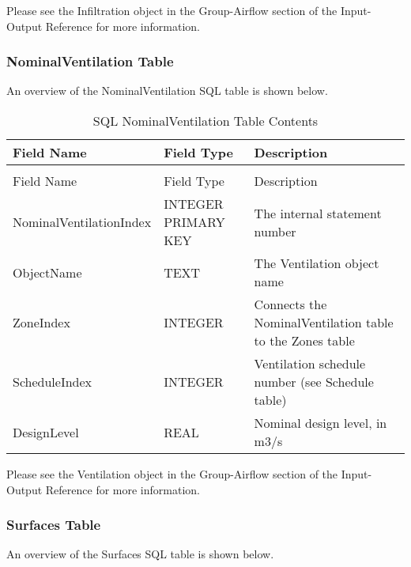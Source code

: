 Please see the Infiltration object in the Group-Airflow section of the Input-Output Reference for more information.

\subsubsection{NominalVentilation Table}

An overview of the NominalVentilation SQL table is shown below.

\begin{longtable}[c]{p{1.5in}p{1.5in}p{3.0in}}
\caption{SQL NominalVentilation Table Contents \label{table:table-24.-sql-nominalventilation-table}} \tabularnewline
\toprule 
Field Name & Field Type & Description \tabularnewline
\midrule
\endfirsthead

\caption[]{SQL NominalVentilation Table Contents} \tabularnewline
\toprule 
Field Name & Field Type & Description \tabularnewline
\midrule
\endhead

NominalVentilationIndex & INTEGER PRIMARY KEY & The internal statement number \tabularnewline
ObjectName & TEXT & The Ventilation object name \tabularnewline
ZoneIndex & INTEGER & Connects the NominalVentilation table to the Zones table \tabularnewline
ScheduleIndex & INTEGER & Ventilation schedule number (see Schedule table) \tabularnewline
DesignLevel & REAL & Nominal design level, in m3/s \tabularnewline
\bottomrule
\end{longtable}

Please see the Ventilation object in the Group-Airflow section of the Input-Output Reference for more information.

\subsubsection{Surfaces Table}

An overview of the Surfaces SQL table is shown below.

